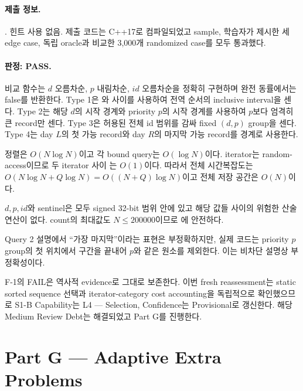 \paragraph{제출 정보.}
. 힌트 사용 없음. 제출 코드는 C++17로 컴파일되었고 sample, 학습자가 제시한 세 edge case, 독립 oracle과 비교한 3,000개 randomized case를 모두 통과했다.

\paragraph{판정: PASS.}
비교 함수는 $d$ 오름차순, $p$ 내림차순, $id$ 오름차순을 정확히 구현하며 완전 동률에서는 false를 반환한다. Type 1은 와  사이를 사용하여 전역 순서의 inclusive interval을 센다. Type 2는 해당 $d$의 시작 경계와 priority $p$의 시작 경계를 사용하여 $p$보다 엄격히 큰 record만 센다. Type 3은 허용된 전체 id 범위를 감싸 fixed $(d,p)$ group을 센다. Type 4는 day $L$의 첫 가능 record와 day $R$의 마지막 가능 record를 경계로 사용한다.

정렬은 $O(N\log N)$이고 각 bound query는 $O(\log N)$이다.  iterator는 random-access이므로 두 iterator 사이 는 $O(1)$이다. 따라서 전체 시간복잡도는 $O(N\log N+Q\log N)=O((N+Q)\log N)$이고 전체 저장 공간은 $O(N)$이다.

$d,p,id$와 sentinel은 모두 signed 32-bit  범위 안에 있고 해당 값들 사이의 위험한 산술 연산이 없다. count의 최대값도 $N\le 200000$이므로 에 안전하다.

Query 2 설명에서 ``가장 마지막''이라는 표현은 부정확하지만, 실제 코드는 priority $p$ group의 첫 위치에서 구간을 끝내어 $p$와 같은 원소를 제외한다. 이는 비차단 설명상 부정확성이다.

F-1의 FAIL은 역사적 evidence로 그대로 보존한다. 이번 fresh reassessment는 static sorted sequence 선택과 iterator-category cost accounting을 독립적으로 확인했으므로 S1-B Capability는 L4 --- Selection, Confidence는 Provisional로 갱신한다. 해당 Medium Review Debt는 해결되었고 Part G를 진행한다.


\section{Part G --- Adaptive Extra Problems}

